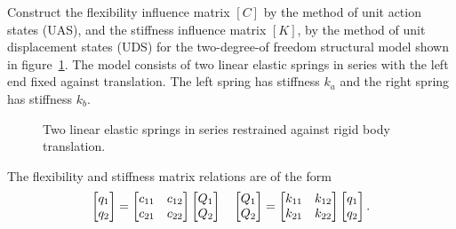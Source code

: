 \documentclass{AeroStructure-ERJohnson}
\begin{document}
\begin{example}\label{ex15.1}\setcounter{equation}{0}\def\theequation{\alph{equation}}Construct the flexibility influence matrix $[C]$ by the method of unit action states (UAS), and the stiffness influence matrix $[K]$, by the method of unit displacement states (UDS) for the two-degree-of freedom structural model shown in figure~\ref{fig15.4}. The model consists of two linear elastic springs in series with the left end fixed against translation. The left spring has stiffness $k_{a}$ and the right spring has stiffness $k_{b}$.

{\def\thefigure{15.4}
\begin{figure}[h]
\caption{Two linear elastic springs in series restrained against rigid body translation.\label{fig15.4}}
\end{figure}
}

The flexibility and stiffness matrix relations are of the form
\begin{align}\label{ex15.1a}
\left[\begin{array}{@{}l@{}}q_{1} \\q_{2}\end{array}\right]=\left[\begin{array}{@{}ll@{}}c_{11} & c_{12} \\c_{21} & c_{22}\end{array}\right]\left[\begin{array}{@{}l@{}}Q_{1} \\Q_{2}\end{array}\right] \quad\left[\begin{array}{@{}l@{}}Q_{1} \\Q_{2}\end{array}\right]=\left[\begin{array}{@{}ll@{}}k_{11} & k_{12} \\k_{21} & k_{22}\end{array}\right]\left[\begin{array}{@{}l@{}}q_{1} \\q_{2}\end{array}\right].
\end{align}


\end{example}
\end{document}
